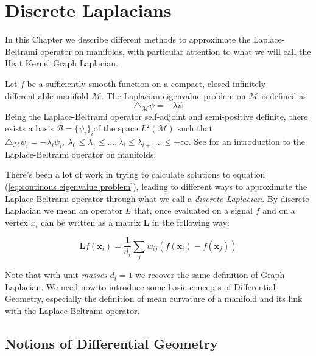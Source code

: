 \pagebreak
\null
\newpage
\section{Discrete Laplacians}\label{sec:Chapter3: other discrete laplacians}
In this Chapter we describe different methods to approximate the Laplace-Beltrami operator on manifolds, with particular attention to what we will call the Heat Kernel Graph Laplacian.

Let $f$ be a sufficiently smooth function on a compact, closed infinitely differentiable manifold $\mathcal M$. The Laplacian eigenvalue problem on $\mathcal M$ is defined as 
\begin{equation}\label{eq:continous eigenvalue problem}
\triangle_{\mathcal M}\psi = -\lambda \psi
\end{equation}
Being the Laplace-Beltrami operator self-adjoint and semi-positive definite, there exists a basis $\mathcal B=\{\psi_i\}_i$of the space $L^2(\mathcal M)$ such that $\triangle_\mathcal M \psi_i = -\lambda_i\psi_i,\ \lambda_0\leq\lambda_1\leq...,\lambda_i\leq\lambda_{i+1}...\leq+\infty$. See \cite{rosenberg_1997} for an introduction to the Laplace-Beltrami operator on manifolds.

There's been a lot of work in trying to calculate solutions to equation (\ref{eq:continous eigenvalue problem}), leading to different ways to approximate the Laplace-Beltrami operator through what we call a \textit{discrete Laplacian}. By discrete Laplacian we mean an operator $L$ that, once evaluated on a signal $f$ and on a vertex $x_i$ can be written as a matrix $\mathbf L$ in the following way:

\begin{equation}\label{eq:discrete laplacian}
\mathbf L f\left(\mathbf{x}_{i}\right)=\frac{1}{d_{i}} \sum_{j} w_{i j}\left(f\left(\mathbf{x}_{i}\right)-f\left(\mathbf{x}_{j}\right)\right)
\end{equation}

Note that with unit \textit{masses} $d_i=1$ we recover the same definition of Graph Laplacian. We need now to introduce some basic concepts of Differential Geometry, especially the definition of mean curvature of a manifold and its link with the Laplace-Beltrami operator.
\subsection{Notions of Differential Geometry}

